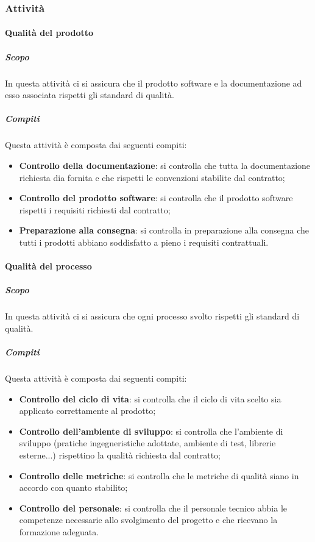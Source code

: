 \subsubsection{Attività}

\paragraph{Qualità del prodotto}
\label{par:qualita_del_prodotto}
\subparagraph{Scopo}
\label{par:qualita_del_prodotto:scopo}
In questa attività ci si assicura che il prodotto software e la documentazione ad esso associata rispetti gli standard di qualità.
\subparagraph{Compiti}
\label{par:qualita_del_prodotto:compiti}
Questa attività è composta dai seguenti compiti:
\begin{itemize}
    \item \textbf{Controllo della documentazione}: si controlla che tutta la documentazione richiesta dia fornita e che rispetti le convenzioni stabilite dal contratto;
    \item \textbf{Controllo del prodotto software}: si controlla che il prodotto software rispetti i requisiti richiesti dal contratto;
    \item \textbf{Preparazione alla consegna}: si controlla in preparazione alla consegna che tutti i prodotti abbiano soddisfatto a pieno i requisiti contrattuali.
\end{itemize}

\paragraph{Qualità del processo}
\label{par:qualita_del_processo}
\subparagraph{Scopo}
\label{par:qualita_del_processo:scopo}
In questa attività ci si assicura che ogni processo svolto rispetti gli standard di qualità.
\subparagraph{Compiti}
\label{par:qualita_del_processo:compiti}
Questa attività è composta dai seguenti compiti:
\begin{itemize}
    \item \textbf{Controllo del ciclo di vita}: si controlla che il ciclo di vita scelto sia applicato correttamente al prodotto;
    \item \textbf{Controllo dell'ambiente di sviluppo}: si controlla che l'ambiente di sviluppo (pratiche ingegneristiche adottate, ambiente di test, librerie esterne...) rispettino la qualità richiesta dal contratto;
    \item \textbf{Controllo delle metriche}: si controlla che le metriche di qualità siano in accordo con quanto stabilito;
    \item \textbf{Controllo del personale}: si controlla che il personale tecnico abbia le competenze necessarie allo svolgimento del progetto e che ricevano la formazione adeguata.
\end{itemize}

